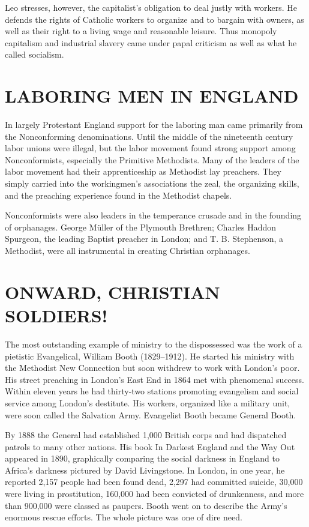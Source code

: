 Leo stresses, however, the capitalist’s obligation to deal justly with workers. He defends the
rights of Catholic workers to organize and to bargain with owners, as well as their right to a
living wage and reasonable leisure. Thus monopoly capitalism and industrial slavery came under papal
criticism as well as what he called socialism.

\section{LABORING MEN IN ENGLAND}

In largely Protestant England support for the laboring man came primarily from the Nonconforming
denominations. Until the middle of the nineteenth century labor unions were illegal, but the labor
movement found strong support among Nonconformists, especially the Primitive Methodists. Many of the
leaders of the labor movement had their apprenticeship as Methodist lay preachers. They simply
carried into the workingmen’s associations the zeal, the organizing skills, and the preaching
experience found in the Methodist chapels.

Nonconformists were also leaders in the temperance crusade and in the founding of orphanages. George
Müller of the Plymouth Brethren; Charles Haddon Spurgeon, the leading Baptist preacher in London;
and T. B. Stephenson, a Methodist, were all instrumental in creating Christian orphanages.

\section{ONWARD, CHRISTIAN SOLDIERS!}

The most outstanding example of ministry to the dispossessed was the work of a pietistic
Evangelical, William Booth (1829–1912). He started his ministry with the Methodist New Connection
but soon withdrew to work with London’s poor. His street preaching in London’s East End in 1864 met
with phenomenal success. Within eleven years he had thirty-two stations promoting evangelism and
social service among London’s destitute. His workers, organized like a military unit, were soon
called the Salvation Army. Evangelist Booth became General Booth.

By 1888 the General had established 1,000 British corps and had dispatched patrols to many other
nations. His book In Darkest England and the Way Out appeared in 1890, graphically comparing the
social darkness in England to Africa’s darkness pictured by David Livingstone. In London, in one
year, he reported 2,157 people had been found dead, 2,297 had committed suicide, 30,000 were living
in prostitution, 160,000 had been convicted of drunkenness, and more than 900,000 were classed as
paupers. Booth went on to describe the Army’s enormous rescue efforts. The whole picture was one of
dire need.

